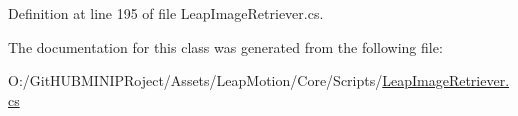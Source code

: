 Definition at line 195 of file Leap\+Image\+Retriever.\+cs.



The documentation for this class was generated from the following file\+:\begin{DoxyCompactItemize}
\item 
O\+:/\+Git\+H\+U\+B\+M\+I\+N\+I\+P\+Roject/\+Assets/\+Leap\+Motion/\+Core/\+Scripts/\mbox{\hyperlink{_leap_image_retriever_8cs}{Leap\+Image\+Retriever.\+cs}}\end{DoxyCompactItemize}
